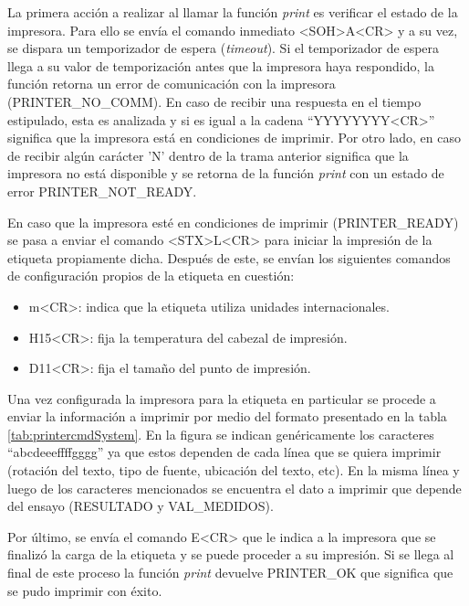 La primera acción a realizar al llamar la función \textit{print} es verificar el estado de la impresora. Para ello se envía el comando inmediato \textless{}SOH\textgreater{}A\textless{}CR\textgreater{} y a su vez, se dispara un temporizador de espera (\textit{timeout}). Si el temporizador de espera llega a su valor de temporización antes que la impresora haya respondido, la función retorna un error de comunicación con la impresora (PRINTER\_NO\_COMM). En caso de recibir una  respuesta en el tiempo estipulado, esta es analizada y si es igual a la cadena ``YYYYYYYY\textless{}CR\textgreater{}'' significa que la impresora está en condiciones de imprimir. Por otro lado, en caso de recibir algún carácter 'N' dentro de la trama anterior significa que la impresora no está disponible y se retorna de la función \textit{print} con un estado de error PRINTER\_NOT\_READY.

En caso que la impresora esté en condiciones de imprimir (PRINTER\_READY) se pasa a enviar el comando \textless{}STX\textgreater{}L\textless{}CR\textgreater{} para iniciar la impresión de la etiqueta propiamente dicha. Después de este, se envían los siguientes comandos de configuración propios de la etiqueta en cuestión:
\begin{itemize}
\item m\textless{}CR\textgreater{}: indica que la etiqueta utiliza unidades internacionales.
\item H15\textless{}CR\textgreater{}: fija la temperatura del cabezal de impresión.
\item D11\textless{}CR\textgreater{}: fija el tamaño del punto de impresión.
\end{itemize}

Una vez configurada la impresora para la etiqueta en particular se procede a enviar la información a imprimir por medio del formato presentado en la tabla \ref{tab:printercmdSystem}. En la figura se indican genéricamente los caracteres ``abcdeeeffffgggg'' ya que estos dependen de cada línea que se quiera imprimir (rotación del texto, tipo de fuente, ubicación del texto, etc). En la misma línea y luego de los caracteres mencionados se encuentra el dato a imprimir que depende del ensayo (RESULTADO y VAL\_MEDIDOS).

Por último, se envía el comando E\textless{}CR\textgreater{} que le indica a la impresora que se finalizó la carga de la etiqueta y se puede proceder a su impresión. Si se llega al final de este proceso la función \textit{print} devuelve PRINTER\_OK que significa que se pudo imprimir con éxito.

